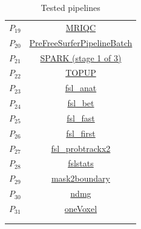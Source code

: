 \begin{table}
\begin{tabular}{cc}
        $P_{19}$ & \href{https://doi.org/10.5281/zenodo.3242714}{MRIQC}	\\
        $P_{20}$ & \href{https://doi.org/10.5281/zenodo.1450995}{PreFreeSurferPipelineBatch}	\\
        $P_{21}$ & \href{https://doi.org/10.5281/zenodo.4010734}{SPARK (stage 1 of 3)}	\\
        $P_{22}$ & \href{https://doi.org/10.5281/zenodo.2621482}{TOPUP}	\\
        $P_{23}$ & \href{https://doi.org/10.5281/zenodo.3899496}{fsl\_anat}	\\
        $P_{24}$ & \href{https://doi.org/10.5281/zenodo.1482743}{fsl\_bet}	\\
        $P_{25}$ & \href{https://doi.org/10.5281/zenodo.1494308}{fsl\_fast}	\\
        $P_{26}$ & \href{https://doi.org/10.5281/zenodo.1494312}{fsl\_first}	\\
        $P_{27}$ & \href{target: https://doi.org/10.5281/zenodo.1450991}{fsl\_probtrackx2}	\\
        $P_{28}$ & \href{https://doi.org/10.5281/zenodo.4472771}{fslstats}	\\
        $P_{29}$ & \href{https://doi.org/10.5281/zenodo.2566443}{mask2boundary}\\
        $P_{30}$ & \href{https://doi.org/10.5281/zenodo.1450999}{ndmg}	\\
        $P_{31}$ & \href{https://doi.org/10.5281/zenodo.3308620}{oneVoxel}\\
        \hline\\
        &
    \end{tabular}
    \caption{Tested pipelines}
    \label{tab:pipeline_names}
\end{table}



